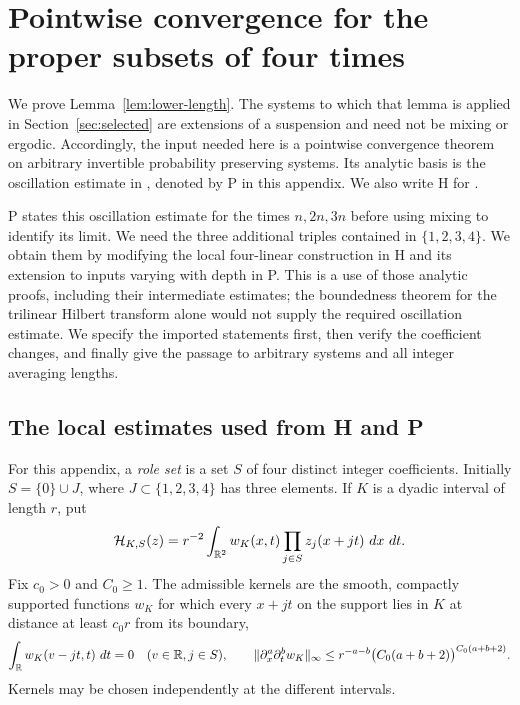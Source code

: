 \section{Pointwise convergence for the proper subsets of four times}
\label{sec:lower-length}

We prove Lemma~\ref{lem:lower-length}.  The systems to which that lemma
is applied in Section~\ref{sec:selected} are extensions of a suspension
and need not be mixing or ergodic.  Accordingly, the input needed here
is a pointwise convergence theorem on arbitrary invertible probability
preserving systems.  Its analytic basis is the oscillation estimate in
\cite[Proposition~2.2]{TripleCompanion}, denoted by P in this appendix.  We also
write H for \cite{HilbertCompanion}.

P states this oscillation estimate for the times $n,2n,3n$ before using
mixing to identify its limit.  We need the three additional triples
contained in $\{1,2,3,4\}$.  We obtain them by modifying the local
four-linear construction in H and its extension to inputs varying with
depth in P.  This is a use of those analytic proofs, including their
intermediate estimates; the boundedness theorem for the trilinear
Hilbert transform alone would not supply the required oscillation
estimate.  We specify the imported statements first, then verify the
coefficient changes, and finally give the passage to arbitrary systems
and all integer averaging lengths.

\subsection{The local estimates used from H and P}

For this appendix, a \emph{role set} is a set $S$ of four distinct
integer coefficients.  Initially $S=\{0\}\cup J$, where
$J\subset\{1,2,3,4\}$ has three elements.  If $K$ is a dyadic interval
of length $r$, put
\begin{equation}
 \mathcal H_{K,S}(z)
 =r^{-2}\int_{\mathbb R^2}w_K(x,t)\prod_{j\in S}z_j(x+jt)\,\,d x\,\,d t.
 \label{eq:ll-local-form}
\end{equation}
Fix $c_0>0$ and $C_0\ge1$.  The admissible kernels are the smooth,
compactly supported functions $w_K$ for which every $x+jt$ on the
support lies in $K$ at distance at least $c_0r$ from its boundary,
\begin{equation}
 \int_{\mathbb R}w_K(v-jt,t)\,\,d t=0
 \quad(v\in\mathbb R, j\in S),
 \qquad
 \|\partial_x^a\partial_t^b w_K\|_\infty
 \le r^{-a-b}\bigl(C_0(a+b+2)\bigr)^{C_0(a+b+2)}.
 \label{eq:ll-kernels}
\end{equation}
Kernels may be chosen independently at the different intervals.

